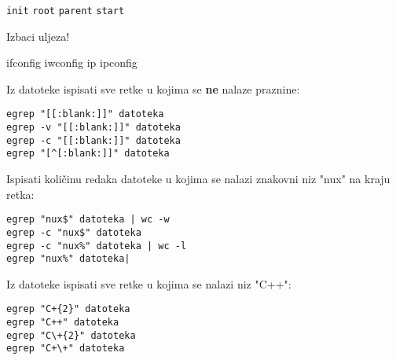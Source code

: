 \documentclass[a4paper,11pt]{exam}
\newcommand{\shell}[1]{\texttt{#1}}
\begin{document}
\begin{questions}
	\begin{oneparchoices}
		\choice \shell{init} 
		\choice \shell{root}  
		\choice \shell{parent} 
		\CorrectChoice \shell{start}
	\end{oneparchoices}
	
	\question
	Izbaci uljeza!
	
	\begin{oneparchoices}
		\choice ifconfig
		\choice iwconfig
		\choice ip
		\CorrectChoice ipconfig
	\end{oneparchoices}


\vspace{1em}


	\question
	Iz datoteke ispisati sve retke u kojima se \textbf{ne} nalaze praznine:
	
	\begin{oneparchoices}
		\choice \shell{egrep "[[:blank:]]" datoteka} \\
		\CorrectChoice \shell{egrep -v "[[:blank:]]" datoteka} \\
		\choice \shell{egrep -c "[[:blank:]]" datoteka} \\
		\choice \shell{egrep "[\textasciicircum[:blank:]]" datoteka} \\
	\end{oneparchoices}
	
	\question
	Ispisati količinu redaka datoteke u kojima se nalazi znakovni niz "nux" na kraju retka: 
	
	\begin{oneparchoices}
		\choice \shell{egrep "nux\$" datoteka | wc -w} \\
		\CorrectChoice \shell{egrep -c "nux\$" datoteka} \\
		\choice \shell{egrep -c "nux\%" datoteka | wc -l} \\
		\choice \shell{egrep "nux\%" datoteka|} 
	\end{oneparchoices}
	
	\question
	Iz datoteke ispisati sve retke u kojima se nalazi niz "C++":
	
	\begin{oneparchoices}
		\choice \verb|egrep "C+{2}" datoteka| \\
		\choice \verb|egrep "C++" datoteka| \\
		\CorrectChoice \verb|egrep "C\+{2}" datoteka| \\
		\choice \verb|egrep "C+\+" datoteka|
	\end{oneparchoices}
	

\end{questions}
\end{document}
